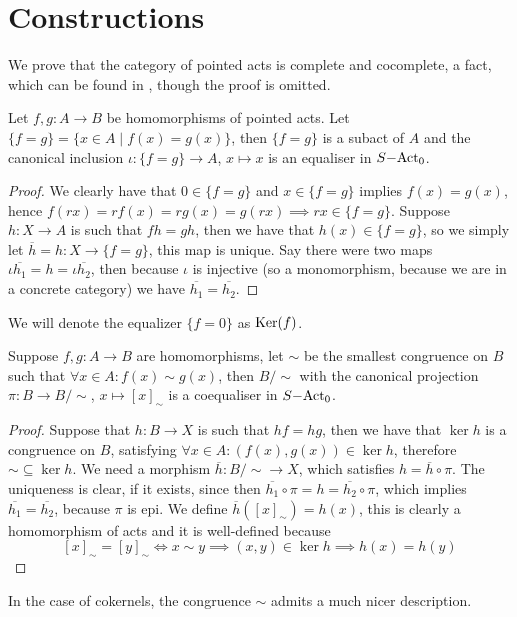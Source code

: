 \section{Constructions}
    We prove that the category of pointed acts is complete and cocomplete, a fact, which can be found in \cite{Kilp00}, though the proof is omitted. 
\begin{proposition}
    Let $f,g: A \to B$ be homomorphisms of pointed acts. Let $\{f=g\} = \{x\in A \mid f(x) = g(x)\}$, then $\{f=g\}$ is a subact of $A$ and 
    the canonical inclusion $\iota: \{f=g\} \to A$, $x\mapsto x$ is an equaliser in $S\mathrm{-Act}_0$.
\end{proposition}
\begin{proof}
    We clearly have that $0\in\{f=g\}$ and $x\in\{f=g\}$ implies $f(x)=g(x)$, hence $f(rx)=rf(x)=rg(x)=g(rx) \implies rx\in\{f=g\}$. 
    Suppose $h: X \to A$ is such that $fh=gh$, then we have that $h(x)\in\{f=g\}$, so we simply let $\overline{h} = h: X\to\{f=g\}$, this
    map is unique. Say there were two maps $\iota\overline{h_1}=h=\iota\overline{h_2}$, then because $\iota$ is injective (so a monomorphism, 
    because we are in a concrete category) we have $\overline{h_1}=\overline{h_2}$.
\end{proof}
    We will denote the equalizer $\{f=0\}$ as $\mathrm{Ker}(f)$. 
\begin{proposition}
    Suppose $f,g: A\to B$ are homomorphisms, let $\sim$ be the smallest congruence on $B$ such that $\forall x\in A: f(x)\sim g(x)$, then 
    $B/\sim$ with the canonical projection $\pi: B\to B/\sim$, $x\mapsto [x]_\sim$ is a coequaliser in $S\mathrm{-Act}_0$. 
\end{proposition}
\begin{proof}
    Suppose that $h: B\to X$ is such that $hf=hg$, then we have that $\ker{h}$ is a congruence on $B$, satisfying 
    $\forall x\in A: (f(x),g(x))\in\ker{h}$, therefore $\sim\subseteq\ker{h}$. We need a morphism $\overline{h}: B/\sim \to X$, which satisfies 
    $h = \overline{h} \circ\pi$. The uniqueness is clear, if it exists, since then $\overline{h_1}\circ\pi = h = \overline{h_2}\circ\pi$, 
    which implies $\overline{h_1}=\overline{h_2}$, because $\pi$ is epi. We define $\overline{h}([x]_\sim) = h(x)$, this 
    is clearly a homomorphism of acts and it is well-defined because
    \[
        [x]_\sim = [y]_\sim\iff x\sim y \implies (x,y)\in\ker{h} \implies h(x)=h(y)
    \] 
\end{proof}
    In the case of cokernels, the congruence $\sim$ admits a much nicer description. 
